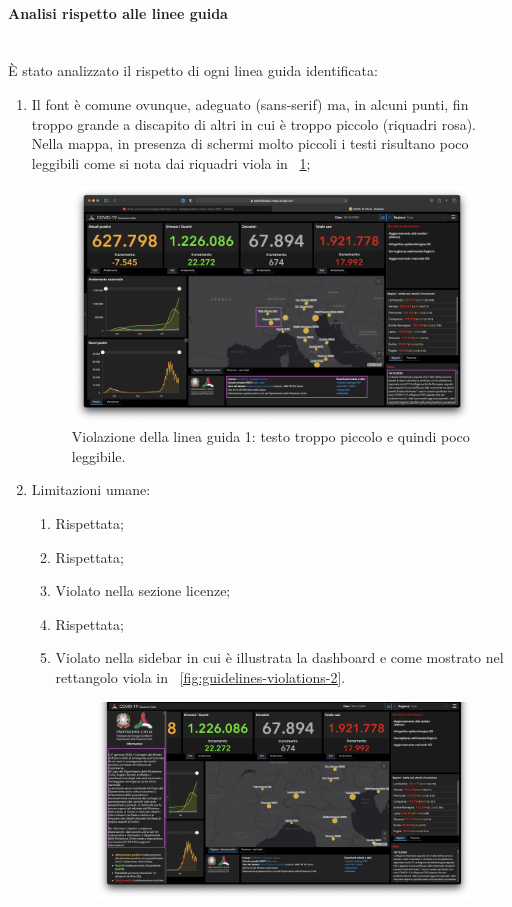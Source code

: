 \paragraph{Analisi rispetto alle linee guida}\mbox{}\\
\`E stato analizzato il rispetto di ogni linea guida identificata:
\begin{enumerate}
    \item Il font è comune ovunque, adeguato (sans-serif) ma, in alcuni punti, fin troppo grande a discapito di altri in cui è troppo piccolo (riquadri rosa). Nella mappa, in presenza di schermi molto piccoli i testi risultano poco leggibili come si nota dai riquadri viola in ~\ref{fig:guidelines-violations-1};
        \begin{figure}[H]
        \centering
        \includegraphics[width=0.5\columnwidth]{../../../assets/images/verifica-risorse-esistenti/guidelines_violations_1.png}
        \caption{Violazione della linea guida 1: testo troppo piccolo e quindi poco leggibile.}
        \label{fig:guidelines-violations-1}
    \end{figure}
    \item Limitazioni umane:
        \begin{enumerate}
                \item Rispettata;
                \item Rispettata;
                \item Violato nella sezione licenze;
                \item Rispettata;
                \item Violato nella sidebar in cui è illustrata la dashboard e come mostrato nel rettangolo viola in ~\ref{fig:guidelines-violations-2}.
                    \begin{figure}[H]
                    \centering
                    \includegraphics[width=0.5\columnwidth]{../../../assets/images/verifica-risorse-esistenti/guidelines_violations_2.png}

\end{figure}
\end{enumerate}
\end{enumerate}

